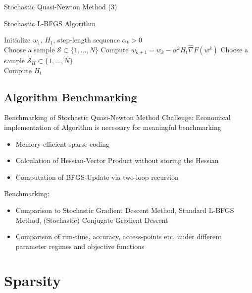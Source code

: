\documentclass[11pt]{beamer}
\begin{document}
	\begin{frame}{Stochastic Quasi-Newton Method (3)}
		\begin{block}{Stochastic L-BFGS Algorithm}
			\begin{algorithm}[H]
				\begin{algorithmic}[1]
					\STATE Initialize $w_1$, $H_1$, step-length sequence $\alpha_k > 0$ \\
					\STATE Choose a sample $\mathcal{S} \subset \{1, \dots, N\}$
					\STATE Compute $w_{k+1} = w_k - \alpha^k H_t \widehat{\nabla}F(w^k)$
					\STATE Choose a sample $\mathcal{S}_H \subset \{1, \dots, N\}$ \\
					\STATE Compute $H_t$ \\
					\ENDIF
					\ENDFOR
				\end{algorithmic}
			\end{algorithm}
		\end{block}
	\end{frame}
	
	\subsection{Algorithm Benchmarking}
	
	\begin{frame}{Benchmarking of Stochastic Quasi-Newton Method}
		Challenge: Economical implementation of Algorithm is necessary for meaningful 
		benchmarking
		\begin{itemize}
			\item Memory-efficient sparse coding
			\item Calculation of Hessian-Vector Product without storing the Hessian
			\item Computation of BFGS-Update via two-loop recursion
		\end{itemize}
		\vspace{0.3cm}
		\pause
		Benchmarking:
		\begin{itemize}
			\item Comparison to Stochastic Gradient Descent Method, Standard L-BFGS Method, 
			(Stochastic) Conjugate Gradient Descent
			\item Comparison of run-time, accuracy, access-points etc. under different parameter 
			regimes and objective functions
		\end{itemize}
	\end{frame}
	
	
	\section{Sparsity}
\end{document}
